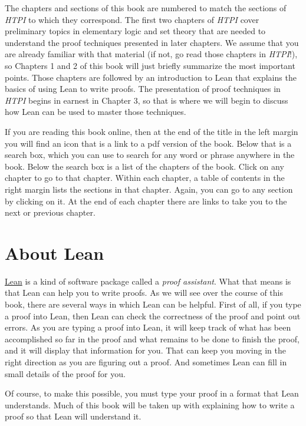 \documentclass[
  letterpaper,
  DIV=11,
  numbers=noendperiod]{scrreprt}
\theoremstyle{remark}
\begin{document}
The chapters and sections of this book are numbered to match the
sections of \emph{HTPI} to which they correspond. The first two chapters
of \emph{HTPI} cover preliminary topics in elementary logic and set
theory that are needed to understand the proof techniques presented in
later chapters. We assume that you are already familiar with that
material (if not, go read those chapters in \emph{HTPI}!), so Chapters 1
and 2 of this book will just briefly summarize the most important
points. Those chapters are followed by an introduction to Lean that
explains the basics of using Lean to write proofs. The presentation of
proof techniques in \emph{HTPI} begins in earnest in Chapter 3, so that
is where we will begin to discuss how Lean can be used to master those
techniques.

If you are reading this book online, then at the end of the title in the
left margin you will find an icon that is a link to a pdf version of the
book. Below that is a search box, which you can use to search for any
word or phrase anywhere in the book. Below the search box is a list of
the chapters of the book. Click on any chapter to go to that chapter.
Within each chapter, a table of contents in the right margin lists the
sections in that chapter. Again, you can go to any section by clicking
on it. At the end of each chapter there are links to take you to the
next or previous chapter.

\hypertarget{about-lean}{%
\section*{About Lean}\label{about-lean}}


\href{https://leanprover.github.io}{Lean} is a kind of software package
called a \emph{proof assistant}. What that means is that Lean can help
you to write proofs. As we will see over the course of this book, there
are several ways in which Lean can be helpful. First of all, if you type
a proof into Lean, then Lean can check the correctness of the proof and
point out errors. As you are typing a proof into Lean, it will keep
track of what has been accomplished so far in the proof and what remains
to be done to finish the proof, and it will display that information for
you. That can keep you moving in the right direction as you are figuring
out a proof. And sometimes Lean can fill in small details of the proof
for you.

Of course, to make this possible, you must type your proof in a format
that Lean understands. Much of this book will be taken up with
explaining how to write a proof so that Lean will understand it.
\end{document}
